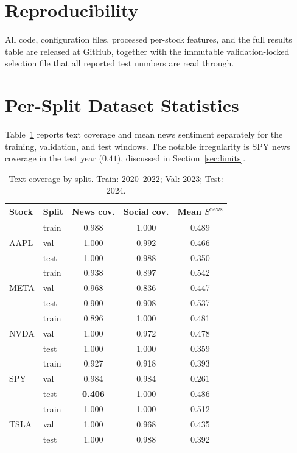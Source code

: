 \documentclass[conference]{IEEEtran}
\begin{document}
\section*{Reproducibility}
All code, configuration files, processed per-stock features, and the
full results table are released at GitHub, together with the immutable
validation-locked selection file that all reported test numbers are read
through.

\appendices
\section{Per-Split Dataset Statistics}
Table~\ref{tab:appendix} reports text coverage and mean news sentiment
separately for the training, validation, and test windows. The notable
irregularity is SPY news coverage in the test year ($0.41$), discussed in
Section~\ref{sec:limits}.

\begin{table}[!ht]
\caption{Text coverage by split. Train: 2020--2022; Val: 2023; Test: 2024.}
\label{tab:appendix}
\centering
\small
\setlength{\tabcolsep}{4pt}
\begin{tabular}{llccc}
\toprule
Stock & Split & News cov. & Social cov. & Mean $S^{\text{news}}$ \\
\midrule
\multirow{3}{*}{AAPL} & train & 0.988 & 1.000 & 0.489 \\
                      & val   & 1.000 & 0.992 & 0.466 \\
                      & test  & 1.000 & 0.988 & 0.350 \\
\midrule
\multirow{3}{*}{META} & train & 0.938 & 0.897 & 0.542 \\
                      & val   & 0.968 & 0.836 & 0.447 \\
                      & test  & 0.900 & 0.908 & 0.537 \\
\midrule
\multirow{3}{*}{NVDA} & train & 0.896 & 1.000 & 0.481 \\
                      & val   & 1.000 & 0.972 & 0.478 \\
                      & test  & 1.000 & 1.000 & 0.359 \\
\midrule
\multirow{3}{*}{SPY}  & train & 0.927 & 0.918 & 0.393 \\
                      & val   & 0.984 & 0.984 & 0.261 \\
                      & test  & \textbf{0.406} & 1.000 & 0.486 \\
\midrule
\multirow{3}{*}{TSLA} & train & 1.000 & 1.000 & 0.512 \\
                      & val   & 1.000 & 0.968 & 0.435 \\
                      & test  & 1.000 & 0.988 & 0.392 \\
\bottomrule
\end{tabular}
\end{table}
\end{document}
